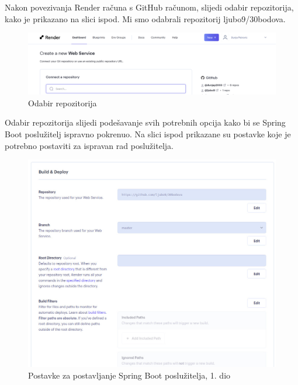 	    Nakon povezivanja Render računa s GitHub računom, slijedi odabir repozitorija, kako je prikazano na slici ispod. Mi smo odabrali repozitorij ljubo9/30bodova.
	    
	    	\begin{figure}[H]
			\includegraphics[scale=0.4]{slike/Render_ODABIR_REPOZITORIJA.PNG} %
			\centering
			\caption{Odabir repozitorija}
			\label{Odabir repozitorija}
		\end{figure}
		
		Odabir repozitorija slijedi podešavanje svih potrebnih opcija kako bi se Spring Boot poslužitelj ispravno pokrenuo. Na slici ispod prikazane su postavke koje je potrebno postaviti za ispravan rad poslužitelja.
		
		\begin{figure}[H]
			\includegraphics[scale=0.4]{slike/Render_BACKEND_1.JPG} %
			\centering
			\caption{Postavke za postavljanje Spring Boot poslužitelja, 1. dio}
			\label{Postavke za postavljanje Spring Boot poslužitelja, 1. dio}
		\end{figure}
		
